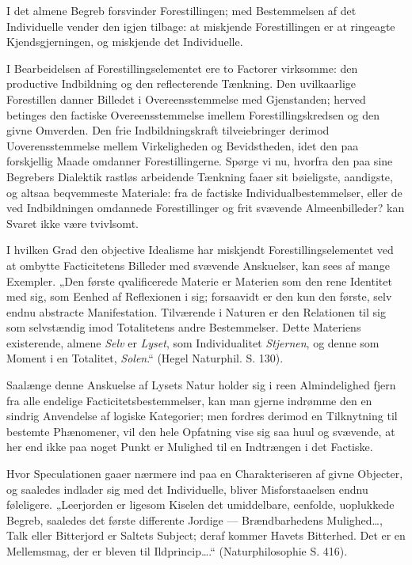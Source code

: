 \documentclass[12pt]{book}
\newcommand{\opage}[1]{\marginnote{\footnotesize\textit{[#1]}}}
\begin{document}
I det almene Begreb forsvinder Forestillingen; med Bestemmelsen af det Individuelle
vender den igjen tilbage:
\opage{49} at miskjende Forestillingen er at ringeagte Kjendsgjerningen, og miskjende det
Individuelle.

I Bearbeidelsen af Forestillingselementet ere to Factorer virksomme: den productive
Indbildning og den reflecterende Tænkning. Den uvilkaarlige Forestillen danner
Billedet i Overeensstemmelse med Gjenstanden; herved betinges den factiske
Overeensstemmelse imellem Forestillingskredsen og den givne Omverden. Den frie
Indbildningskraft tilveiebringer derimod Uoverensstemmelse mellem Virkeligheden og
Bevidstheden, idet den paa forskjellig Maade omdanner Forestillingerne. Spørge vi nu,
hvorfra den paa sine Begrebers Dialektik rastløs arbeidende Tænkning faaer sit
bøieligste, aandigste, og altsaa beqvemmeste Materiale: fra de factiske
Individualbestemmelser, eller de ved Indbildningen omdannede Forestillinger og frit
svævende Almeenbilleder? kan Svaret ikke være tvivlsomt.

I hvilken Grad den objective Idealisme har miskjendt Forestillingselementet ved at
ombytte Facticitetens Billeder med svævende Anskuelser, kan sees af mange Exempler.
„Den første qvalificerede Materie er Materien som den rene Identitet med sig, som
Eenhed af Reflexionen i sig; forsaavidt er den kun den første, selv endnu abstracte
Manifestation. Tilværende i Naturen er den Relationen til sig som selvstændig imod
Totalitetens andre Bestemmelser. Dette Materiens existerende, almene \emph{Selv} er
\emph{Lyset}, som Individualitet \emph{Stjernen}, og denne som Moment i en Totalitet,
\emph{Solen}.“ (Hegel Naturphil. S. 130).

Saalænge denne Anskuelse af Lysets Natur holder sig i reen Almindelighed fjern fra
alle endelige Facticitetsbestemmelser, kan man gjerne indrømme den en sindrig
Anvendelse af logiske Kategorier; men fordres derimod en Tilknytning til bestemte
Phænomener, vil den hele Opfatning vise sig saa huul og svævende, at her end ikke paa
noget Punkt er Mulighed til en Indtrængen i det Factiske.

\opage{50} Hvor Speculationen gaaer nærmere ind paa en Charakteriseren af givne Objecter, og
saaledes indlader sig med det Individuelle, bliver Misforstaaelsen endnu føleligere.
„Leerjorden er ligesom Kiselen det umiddelbare, eenfolde, uoplukkede Begreb, saaledes
det første differente Jordige — Brændbarhedens Mulighed\ldots, Talk eller Bitterjord
er Saltets Subject; deraf kommer Havets Bitterhed. Det er en Mellemsmag, der er bleven
til Ildprincip\ldots.“ (Naturphilosophie S. 416).
\end{document}
